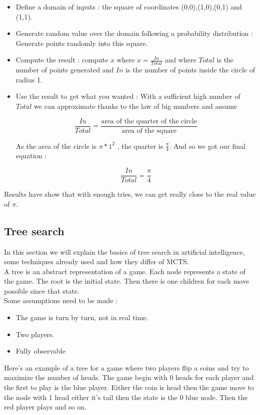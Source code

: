 \begin{itemize}
\item Define a domain of inputs : the square of coordinates (0,0),(1,0),(0,1) and (1,1).
\item Generate random value over the domain following a probability distribution : Generate points randomly into this square. 
\item Compute the result : compute $x$ where $x = \frac{In}{Total}$ and where $Total$ is the number of points generated and $In$ is the number of points inside the circle of radius 1. 
\item Use the result to get what you wanted : With a sufficient high number of $Total$ we can approximate thanks to the law of big numbers and assume


$$\frac{In}{Total}= \frac{\textrm{area of the quarter of the circle}}{\textrm{area of the square}}$$

 As the area of the circle is $ \pi*1^2$ , the quarter is $\frac{\pi}{4}$. And so we got our final equation : 

$$
\frac{In}{Total}=\frac{\pi}{4}
$$
\end{itemize} 

Results have show that with enough tries, we can get really close to the real value of $\pi$. 

\subsection{Tree search}
In this section we will explain the basics of tree search in artificial intelligence, some techniques already used and how they differ of MCTS. 
\\

A tree is an abstract representation of a game. Each node represents a state of the game. The root is the initial state. Then there is one children for each move possible since that state. 
\\

Some assumptions need to be made : 
\begin{itemize}
\item The game is turn by turn, not in real time. 
\item Two players.
\item Fully observable

\end{itemize}

Here's an example of a tree for a game where two players flip a coins and try to maximize the number of heads. The game begin with 0 heads for each player and the first to play is the blue player. Either the coin is head then the game move to the node with 1 head either it's tail then the state is the 0 blue node. Then the red player plays and so on. 
\begin{center}
\end{center}
